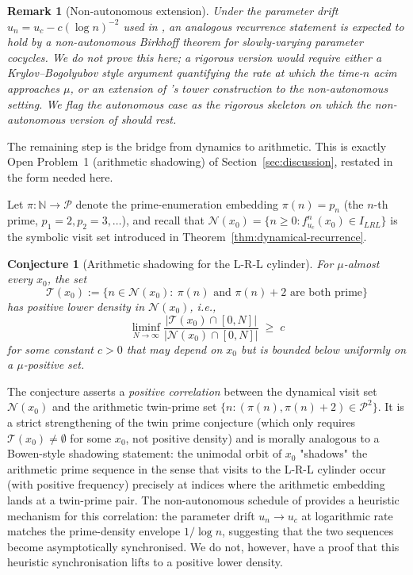 \documentclass[cupthm,crop,info]{CUP-JNL-ETS}
\theoremstyle{cupplain}
\newtheorem{conjecture}[theorem]{Conjecture}
\theoremstyle{cupdefinition}
\theoremstyle{cupremark}
\newtheorem{remark}[theorem]{Remark}
\numberwithin{equation}{section}
\begin{document}
\begin{remark}[Non-autonomous extension]
\label{rem:non-auto}
Under the parameter drift $u_n = u_c - c (\log n)^{-2}$ used in
\cite{wang2026emergence}, an analogous recurrence statement is expected
to hold by a non-autonomous Birkhoff theorem for slowly-varying
parameter cocycles. We do not prove this here; a rigorous version
would require either a Krylov--Bogolyubov style argument quantifying
the rate at which the time-$n$ acim approaches $\mu$, or an extension
of \cite{young1992decay}'s tower construction to the non-autonomous
setting. We flag the autonomous case as the rigorous skeleton on which
the non-autonomous version of \cite{wang2026emergence} should rest.
\end{remark}

The remaining step is the bridge from dynamics to arithmetic. This is
exactly Open Problem~1 (arithmetic shadowing) of
Section~\ref{sec:discussion}, restated in the form needed here.

Let $\pi : \mathbb{N} \to \mathcal{P}$ denote the prime-enumeration
embedding $\pi(n) = p_n$ (the $n$-th prime, $p_1 = 2, p_2 = 3, \ldots$),
and recall that $\mathcal{N}(x_0) = \{ n \geq 0 : f_{u_c}^n(x_0) \in I_{LRL}\}$
is the symbolic visit set introduced in
Theorem~\ref{thm:dynamical-recurrence}.

\begin{conjecture}[Arithmetic shadowing for the L-R-L cylinder]
\label{conj:arith-shadow-LRL}
For $\mu$-almost every $x_0$, the set
\[
    \mathcal{T}(x_0) := \{ n \in \mathcal{N}(x_0) :\
        \pi(n) \text{ and } \pi(n) + 2 \text{ are both prime} \}
\]
has positive lower density in $\mathcal{N}(x_0)$, i.e.,
\[
    \liminf_{N \to \infty}
    \frac{|\mathcal{T}(x_0) \cap [0, N]|}{|\mathcal{N}(x_0) \cap [0, N]|}
    \;\geq\; c
\]
for some constant $c > 0$ that may depend on $x_0$ but is bounded
below uniformly on a $\mu$-positive set.
\end{conjecture}

The conjecture asserts a \emph{positive correlation} between the
dynamical visit set $\mathcal{N}(x_0)$ and the arithmetic twin-prime
set $\{n : (\pi(n), \pi(n)+2) \in \mathcal{P}^2\}$. It is a strict
strengthening of the twin prime conjecture (which only requires
$\mathcal{T}(x_0) \neq \emptyset$ for some $x_0$, not positive density)
and is morally analogous to a Bowen-style shadowing statement: the
unimodal orbit of $x_0$ "shadows" the arithmetic prime sequence in the
sense that visits to the L-R-L cylinder occur (with positive
frequency) precisely at indices where the arithmetic embedding lands
at a twin-prime pair. The non-autonomous schedule of
\cite{wang2026emergence} provides a heuristic mechanism for this
correlation: the parameter drift $u_n \to u_c$ at logarithmic rate
matches the prime-density envelope $1/\log n$, suggesting that the
two sequences become asymptotically synchronised. We do not, however,
have a proof that this heuristic synchronisation lifts to a positive
lower density.
\end{document}
